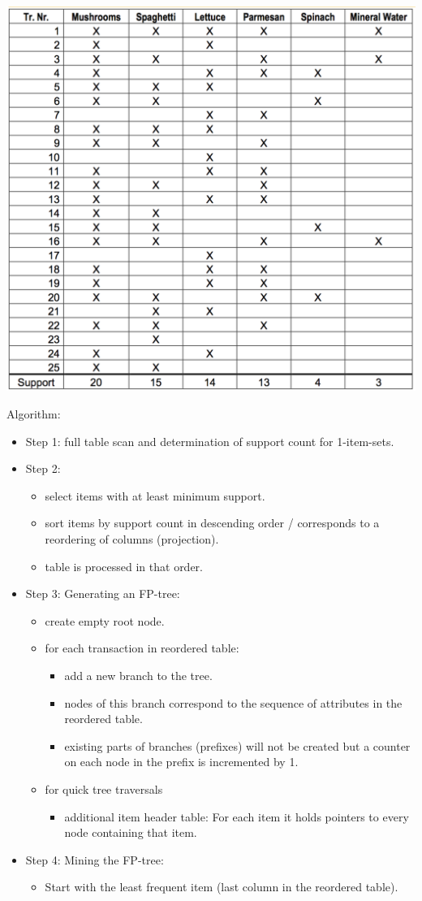 \begin{breakbox}
\begin{center}
\includegraphics[width=.15\textwidth]{slides_images/fp_growth_data}
\end{center}
Algorithm:
\begin{itemize}
	\item Step 1: full table scan and determination of support count for 1-item-sets.
	\item Step 2:
		\begin{itemize}
			\item select items with at least minimum support.
			\item sort items by support count in descending order / corresponds to a reordering of columns (projection).
			\item table is processed in that order.
		\end{itemize}
	\item Step 3: Generating an FP-tree:
		\begin{itemize}
			\item create empty root node.
			\item for each transaction in reordered table:
				\begin{itemize}
					\item add a new branch to the tree.
					\item nodes of this branch correspond to the sequence of attributes in the reordered table.
					\item existing parts of branches (prefixes) will not be created but a counter on each node in the prefix is incremented by 1.
				\end{itemize}
			\item for quick tree traversals
				\begin{itemize}
					\item additional item header table: For each item it holds pointers to every node containing that item.
				\end{itemize}
		\end{itemize}
	\item Step 4: Mining the FP-tree:
		\begin{itemize}
			\item Start with the least frequent item (last column in the reordered table).

\end{itemize}
\end{itemize}
\end{breakbox}
